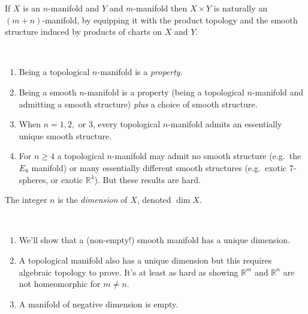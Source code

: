 \documentclass[a4paper,11pt]{article}
\begin{document}
	\begin{ex}
		If $X$ is an $n$-manifold and $Y$ and $m$-manifold then $X \times Y$ is naturally an $(m+n)$-manifold, by equipping it with the product topology and the smooth structure induced by products of charts on $X$ and $Y$.
	\end{ex}

	\begin{rmk} \ 
		\begin{enumerate}
			\item Being a topological $n$-manifold is a \emph{property}.
			\item Being a smooth $n$-manifold is a property (being a topological $n$-manifold and admitting a smooth structure) \emph{plus} a choice of smooth structure.
			\item When $n = 1,2,$ or $3$, every topological $n$-manifold admits an essentially unique smooth structure.
			\item For $n \geq 4$ a topological $n$-manifold may admit no smooth structure (e.g.\ the $E_8$ manifold) or many essentially different smooth structures (e.g.\ exotic 7-spheres, or exotic $\mathbb{R}^4$). But these results are hard. 
		\end{enumerate}
	\end{rmk}

	\begin{defi}
		The integer $n$ is the \emph{dimension} of $X$, denoted $\dim X$.
	\end{defi}

	\begin{rmk} \ 
		\begin{enumerate}
			\item We'll show that a (non-empty!) smooth manifold has a unique dimension.
			\item A topological manifold also has a unique dimension but this requires algebraic topology to prove. It's at least as hard as showing $\mathbb{R}^m$ and $\mathbb{R}^n$ are not homeomorphic for $m \neq n$.
			\item A manifold of negative dimension is empty.
		\end{enumerate}
	\end{rmk}
\end{document}
